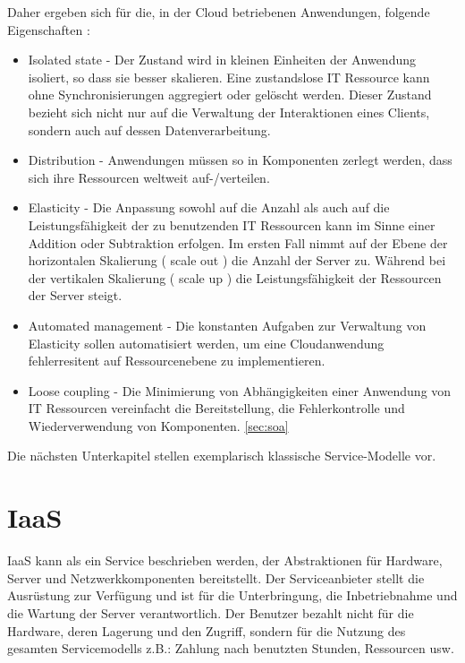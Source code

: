 \documentclass[
12pt,
english,
ngerman,
headsepline,
twoside,
openright,
numbers=noenddot,version=first
]{scrreprt}
\begin{document}
Daher ergeben sich für die, in der Cloud betriebenen Anwendungen, folgende Eigenschaften \cite{cloudEssentials}: 
\begin{itemize}
	\item Isolated state - Der Zustand wird in kleinen Einheiten der Anwendung isoliert, so dass sie besser skalieren. Eine zustandslose IT Ressource kann ohne Synchronisierungen aggregiert oder gelöscht werden. Dieser Zustand bezieht sich nicht nur auf die Verwaltung der Interaktionen eines Clients, sondern auch auf dessen Datenverarbeitung. 
	\item Distribution - Anwendungen müssen so in Komponenten zerlegt werden, dass sich ihre Ressourcen weltweit auf-/verteilen.
	\item Elasticity\label{app-char:elascitity} - Die Anpassung sowohl auf die Anzahl als auch auf die Leistungsfähigkeit der zu benutzenden IT Ressourcen kann im Sinne einer Addition oder Subtraktion erfolgen. Im ersten Fall nimmt auf der Ebene der horizontalen Skalierung ( scale out ) die Anzahl der Server zu. Während bei der vertikalen Skalierung ( scale up ) die Leistungsfähigkeit der Ressourcen der Server steigt.
	\item Automated management - Die konstanten Aufgaben zur Verwaltung von Elasticity sollen automatisiert werden, um eine Cloudanwendung fehlerresitent auf Ressourcenebene zu implementieren.
	\item Loose coupling - Die Minimierung von Abhängigkeiten einer Anwendung von IT Ressourcen vereinfacht die Bereitstellung, die Fehlerkontrolle und Wiederverwendung von Komponenten. \autoref{sec:soa} 
\end{itemize}

Die nächsten Unterkapitel stellen exemplarisch klassische Service-Modelle vor.

\section{IaaS}
\label{sec:iaas}
\acrfull{IaaS} kann als ein Service beschrieben werden, der Abstraktionen für Hardware, Server und Netzwerkkomponenten bereitstellt. Der Serviceanbieter stellt die Ausrüstung zur Verfügung und ist für die Unterbringung, die Inbetriebnahme und die Wartung der Server verantwortlich\cite{patternAWS}. Der Benutzer bezahlt nicht für die Hardware, deren Lagerung und den Zugriff, sondern für die Nutzung des gesamten Servicemodells z.B.: Zahlung nach benutzten Stunden, Ressourcen usw.
\end{document}

